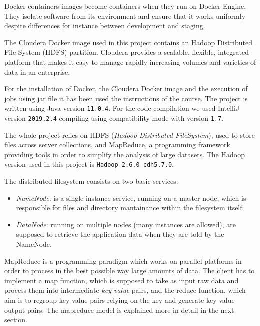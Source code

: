 \documentclass[a4paper,11pt, twoside, openright]{article}
\begin{document}
		\bigskip

		\noindent
		Docker containers images become containers when they run on Docker Engine. They isolate software from its environment and ensure that it works uniformly despite differences for instance between development and staging.
		
		\bigskip

		\noindent
		The Cloudera\parencite{Cloudera} Docker image used in this project contains an Hadoop Distributed File System (HDFS) partition. Cloudera provides a scalable, flexible, integrated platform that makes it easy to manage rapidly increasing volumes and varieties of data in an enterprise. 

		\bigskip

		\noindent
		For the installation of Docker, the Cloudera Docker image and the execution of jobs using jar file it has been used the instructions of the course. The project is written using Java version \texttt{11.0.4}. For the code compilation we used IntelliJ version \texttt{2019.2.4} compiling using compatibility mode with version \texttt{1.7}.
		
		\bigskip
		
		\noindent
		The whole project relies on HDFS (\textit{Hadoop Distributed FileSystem})\parencite{Hadoop-Mapreduce}, used to store files across server collections, and MapReduce, a programming framework providing tools in order to simplify the analysis of large datasets. The Hadoop version used in this project is \texttt{Hadoop 2.6.0-cdh5.7.0}.
		
		The distributed filesystem consists on two basic services: \begin{itemize}
			\item \textit{NameNode}: is a single instance service, running on a master node, which is responsible for files and directory mantainance within the filesystem itself;
			
			\item \textit{DataNode}: running on multiple nodes (many instances are allowed), are supposed to retrieve the application data when they are told by the NameNode.
		\end{itemize}
	
		MapReduce is a programming paradigm which works on parallel platforms in order to process in the best possible way large amounts of data. The client has to implement a map function, which is supposed to take as input raw data and process them into intermediate \textit{key-value} pairs, and the reduce function, which aim is to regroup key-value pairs relying on the key and generate key-value output pairs. The mapreduce model is explained more in detail in the next section.
\end{document}
